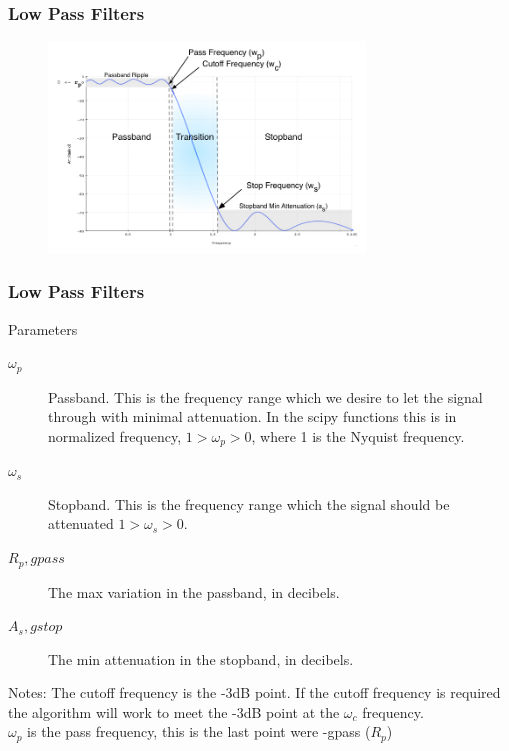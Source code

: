 \documentclass[10pt,colorlinks]{beamer}
\begin{document}
\begin{frame}[fragile]\frametitle{ Low Pass Filters}
\begin{figure}[!htb]
    \centering
    \includegraphics[width=0.75\textwidth]{figs/filters}
\end{figure}
\end{frame}


\begin{frame}[fragile]\frametitle{Low Pass Filters}
\begin{block}{Parameters}
\begin{description}
    \item[$\omega_p$] Passband.  This is the frequency range which we desire to let the signal through with minimal attenuation. In the scipy functions this is in normalized frequency, $1> \omega_p  > 0$, where 1 is the Nyquist frequency.
    \item[$\omega_s$] Stopband.  This is the frequency range which the signal should be attenuated  $1> \omega_s  > 0$.
    \item[$R_p, gpass$] The max variation in the passband, in decibels.
    \item[$A_s, gstop$] The min attenuation in the stopband, in decibels.
\end{description}
\end{block}
\Tiny Notes:
{\tiny The cutoff frequency is the -3dB point.  If the cutoff frequency is required the algorithm will work to meet the -3dB point at the $\omega_c$ frequency.\\
$\omega_p$ is the pass frequency, this is the last point were -gpass ($R_p$)
}
\end{frame}
\end{document}
